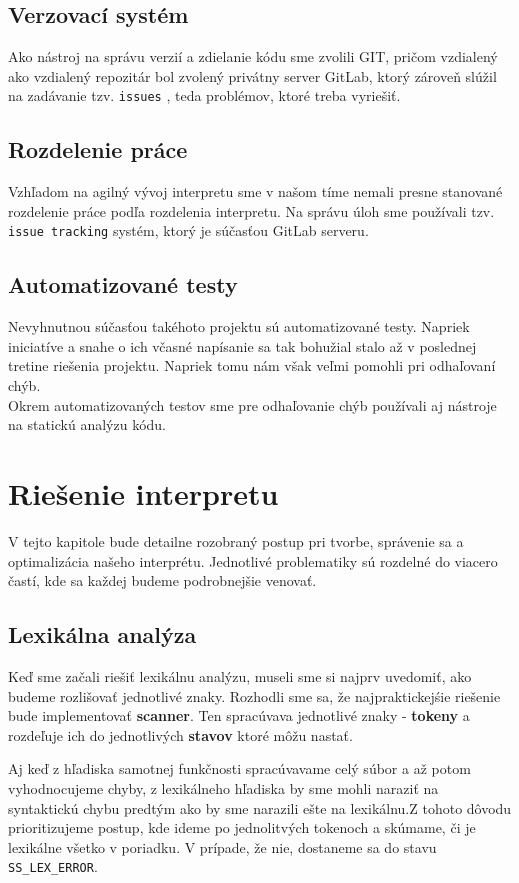 \documentclass[12pt, a4paper]{article}
\begin{document}
        \subsection{Verzovací systém}
			Ako nástroj na správu verzií a zdielanie kódu sme zvolili GIT, pričom vzdialený ako vzdialený repozitár bol zvolený privátny server GitLab, ktorý zároveň slúžil na zadávanie tzv. \texttt{issues} , teda problémov, ktoré treba vyriešiť.
		\subsection{Rozdelenie práce}
			Vzhľadom na agilný vývoj interpretu sme v našom tíme nemali presne stanované rozdelenie práce podľa rozdelenia interpretu. Na správu úloh sme používali tzv. \texttt{issue tracking} systém, ktorý je súčasťou GitLab serveru.
        \subsection{Automatizované testy}
	        Nevyhnutnou súčasťou takéhoto projektu sú automatizované testy. Napriek iniciatíve a snahe o ich včasné napísanie sa tak bohužial stalo až v poslednej tretine riešenia projektu. Napriek tomu nám však veľmi pomohli pri odhaľovaní chýb.\\
	        Okrem automatizovaných testov sme pre odhaľovanie chýb používali aj nástroje na statickú analýzu kódu.
	\newpage
	\section{Riešenie interpretu}
    V tejto kapitole bude detailne rozobraný postup pri tvorbe, správenie sa a optimalizácia našeho interprétu. Jednotlivé problematiky sú rozdelné do viacero častí, kde sa každej budeme podrobnejšie venovať. 
    
        \subsection{Lexikálna analýza}
        Keď sme začali riešiť lexikálnu analýzu, museli sme si najprv uvedomiť, ako budeme rozlišovať jednotlivé znaky. Rozhodli sme sa, že najpraktickejśie riešenie bude implementovať  \textbf{scanner}. Ten spracúvava jednotlivé znaky - \textbf{tokeny} a rozdeľuje ich do jednotlivých \textbf{stavov} ktoré môžu nastať. 
        
        Aj keď z hľadiska samotnej funkčnosti spracúvavame celý súbor a až potom vyhodnocujeme chyby, z lexikálneho hľadiska by sme mohli naraziť na syntaktickú chybu predtým ako by sme narazili ešte na lexikálnu.Z tohoto dôvodu prioritizujeme postup, kde ideme po jednolitvých tokenoch a skúmame, či je lexikálne všetko v poriadku. V prípade, že nie, dostaneme sa do stavu \verb|SS_LEX_ERROR|.
        
\end{document}
